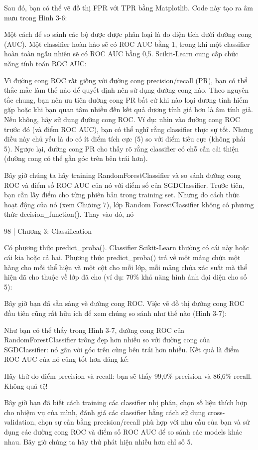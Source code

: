 Sau đó, bạn có thể vẽ đồ thị FPR với TPR bằng Matplotlib. Code này tạo ra âm mưu trong Hình 3-6:

Một cách để so sánh các bộ được được phân loại là đo diện tích dưới đường cong (AUC). Một classifier hoàn hảo sẽ có ROC AUC bằng 1, trong khi một classifier hoàn toàn ngẫu nhiên sẽ có ROC AUC bằng 0,5. Scikit-Learn cung cấp chức năng tính toán ROC AUC:

Vì đường cong ROC rất giống với đường cong precision/recall (PR), bạn có thể thắc mắc làm thế nào để quyết định nên sử dụng đường cong nào. Theo nguyên tắc chung, bạn nên ưu tiên đường cong PR bất cứ khi nào loại dương tính hiếm gặp hoặc khi bạn quan tâm nhiều đến kết quả dương tính giả hơn là âm tính giả. Nếu không, hãy sử dụng đường cong ROC. Ví dụ: nhìn vào đường cong ROC trước đó (và điểm ROC AUC), bạn có thể nghĩ rằng classifier thực sự tốt. Nhưng điều này chủ yếu là do có ít điểm tích cực (5) so với điểm tiêu cực (không phải 5). Ngược lại, đường cong PR cho thấy rõ rằng classifier có chỗ cần cải thiện (đường cong có thể gần góc trên bên trái hơn).

Bây giờ chúng ta hãy training RandomForestClassifier và so sánh đường cong ROC và điểm số ROC AUC của nó với điểm số của SGDClassifier. Trước tiên, bạn cần lấy điểm cho từng phiên bản trong training set. Nhưng do cách thức hoạt động của nó (xem Chương 7), lớp Random ForestClassifier không có phương thức decision\_function(). Thay vào đó, nó

98 | Chương 3: Classification

Có phương thức predict\_proba(). Classifier Scikit-Learn thường có cái này hoặc cái kia hoặc cả hai. Phương thức predict\_proba() trả về một mảng chứa một hàng cho mỗi thể hiện và một cột cho mỗi lớp, mỗi mảng chứa xác suất mà thể hiện đã cho thuộc về lớp đã cho (ví dụ: 70\% khả năng hình ảnh đại diện cho số 5):

Bây giờ bạn đã sẵn sàng vẽ đường cong ROC. Việc vẽ đồ thị đường cong ROC đầu tiên cũng rất hữu ích để xem chúng so sánh như thế nào (Hình 3-7):

Như bạn có thể thấy trong Hình 3-7, đường cong ROC của RandomForestClassifier trông đẹp hơn nhiều so với đường cong của SGDClassifier: nó gần với góc trên cùng bên trái hơn nhiều. Kết quả là điểm ROC AUC của nó cũng tốt hơn đáng kể:

Hãy thử đo điểm precision và recall: bạn sẽ thấy 99,0\% precision và 86,6\% recall. Không quá tệ!

Bây giờ bạn đã biết cách training các classifier nhị phân, chọn số liệu thích hợp cho nhiệm vụ của mình, đánh giá các classifier bằng cách sử dụng cross-validation, chọn sự cân bằng precision/recall phù hợp với nhu cầu của bạn và sử dụng các đường cong ROC và điểm số ROC AUC để so sánh các models khác nhau. Bây giờ chúng ta hãy thử phát hiện nhiều hơn chỉ số 5.


